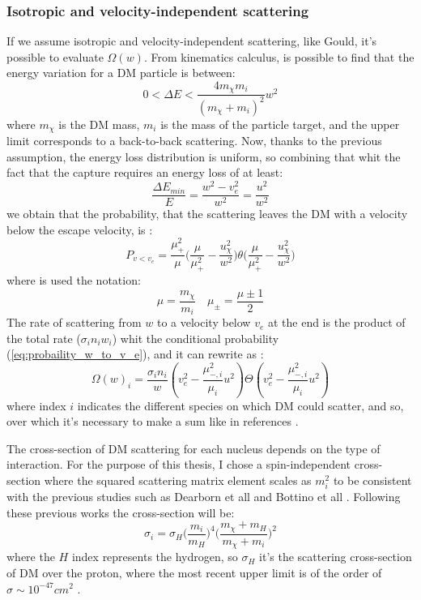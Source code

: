 \subsubsection{Isotropic and velocity-independent  scattering}
If we assume isotropic and velocity-independent scattering, like Gould, it's possible to evaluate $\Omega(w)$. From kinematics calculus, is possible to find that the energy variation for a DM particle is between:
\begin{equation*}
    0<\Delta E < \frac{4m_{\chi}m_i}{(m_{\chi}+m_i)^2}w^2
\end{equation*}
where $m_{\chi}$ is the DM mass, $m_i$ is the mass of the particle target, and the upper limit corresponds to a back-to-back scattering. Now, thanks to the previous assumption, the energy loss distribution is uniform, so combining that whit the fact that the capture requires an energy loss of at least:
\begin{equation*}
    \frac{\Delta E_{min}}{E}=\frac{w^2-v_e^2}{w^2}=\frac{u^2}{w^2}
\end{equation*}
we obtain that the probability, that the scattering leaves the DM with a velocity below the escape velocity, is \cite{Gould:1987ir}:
\begin{equation}
\label{eq:probaility_w_to_v_e}
    P_{v<v_e}=\frac{\mu_+^2}{\mu}\big(\frac{\mu}{\mu_+^2}-\frac{u_{\chi}^2}{w^2}\big)\theta\big(\frac{\mu}{\mu_+^2}-\frac{u_{\chi}^2}{w^2}\big)
\end{equation}
where is used the notation:
\begin{equation*}
    \mu=\frac{m_{\chi}}{m_i}\quad \mu_{\pm}=\frac{\mu\pm 1}{2}
\end{equation*}
The rate of scattering from $w$ to a velocity below $v_e$ at the end is the product of the total rate ($\sigma_{i} n_i w_i$) whit the conditional probability (\ref{eq:probaility_w_to_v_e}), and it can rewrite as \cite{Gould:1987ir}:
\begin{equation}
\Omega(w)_i=\frac{\sigma_{i} n_i}{w}(v_e^2-\frac{\mu_{-,i}^2}{\mu_i}u^2)\Theta(v_e^2-\frac{\mu_{-,i}^2}{\mu_i}u^2)
\end{equation}
where index $i$ indicates the different species on which DM could scatter, and so, over which it's necessary to make a sum like in references \cite{Bottino_2002, DMSun}.

The cross-section of DM scattering for each nucleus depends on the type of interaction. For the purpose of this thesis, I chose a spin-independent cross-section where the squared scattering matrix element scales as $m_i^2$ to be consistent with the previous studies such as Dearborn et all and Bottino et all \cite{Dearborn1990, Bottino_2002}. Following these previous works the cross-section will be:
\begin{equation*}
    \sigma_i=\sigma_H \Big(\frac{m_i}{m_H}\Big)^4\Big(\frac{m_{\chi}+m_H}{m_{\chi}+m_i}\Big)^2
\end{equation*}
where the $H$ index represents the hydrogen, so $\sigma_H$ it's the scattering cross-section of DM over the proton, where the most recent upper limit is of the order of $\sigma\sim 10^{-47} cm^2$ \cite{Xenon_2018}. 

